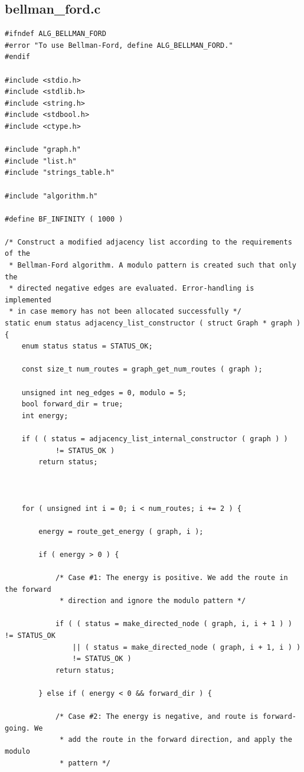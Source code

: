 \documentclass[11pt]{article}
\begin{document}
\subsection{bellman\_ford.c}
\begin{verbatim}
#ifndef ALG_BELLMAN_FORD
#error "To use Bellman-Ford, define ALG_BELLMAN_FORD."
#endif

#include <stdio.h>
#include <stdlib.h>
#include <string.h>
#include <stdbool.h>
#include <ctype.h>

#include "graph.h"
#include "list.h"
#include "strings_table.h"

#include "algorithm.h"

#define BF_INFINITY ( 1000 )

/* Construct a modified adjacency list according to the requirements of the
 * Bellman-Ford algorithm. A modulo pattern is created such that only the
 * directed negative edges are evaluated. Error-handling is implemented
 * in case memory has not been allocated successfully */
static enum status adjacency_list_constructor ( struct Graph * graph )
{
    enum status status = STATUS_OK;

    const size_t num_routes = graph_get_num_routes ( graph );

    unsigned int neg_edges = 0, modulo = 5;
    bool forward_dir = true;
    int energy;

    if ( ( status = adjacency_list_internal_constructor ( graph ) )
            != STATUS_OK )
        return status;

    
    
    for ( unsigned int i = 0; i < num_routes; i += 2 ) {

        energy = route_get_energy ( graph, i );

        if ( energy > 0 ) {

            /* Case #1: The energy is positive. We add the route in the forward
             * direction and ignore the modulo pattern */

            if ( ( status = make_directed_node ( graph, i, i + 1 ) ) != STATUS_OK
                || ( status = make_directed_node ( graph, i + 1, i ) )
                != STATUS_OK )
            return status;

        } else if ( energy < 0 && forward_dir ) {

            /* Case #2: The energy is negative, and route is forward-going. We
             * add the route in the forward direction, and apply the modulo
             * pattern */


\end{verbatim}
\end{document}
